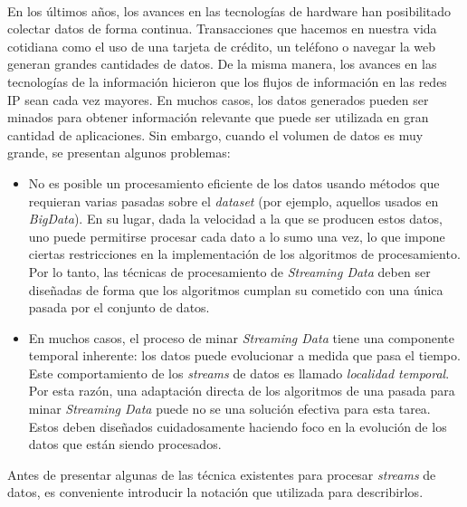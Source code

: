 \documentclass[a4paper,10pt, oneside]{article}
\begin{document}
\

En los últimos años, los avances en las tecnologías de hardware han posibilitado colectar datos de forma continua. Transacciones que hacemos en nuestra vida cotidiana como el uso de una tarjeta de crédito, un teléfono o navegar la web generan grandes cantidades de datos. De la misma manera, los avances en las tecnologías de la información hicieron que los flujos de información en las redes IP sean cada vez mayores. En muchos casos, los datos generados pueden ser minados para obtener información relevante que puede ser utilizada en gran cantidad de aplicaciones. Sin embargo, cuando el volumen de datos es muy grande, se presentan algunos problemas:

\begin{itemize}
	\item No es posible un procesamiento eficiente de los datos usando métodos que requieran varias pasadas sobre el \textit{dataset} (por ejemplo, aquellos usados en \textit{BigData}). En su lugar, dada la velocidad a la que se producen estos datos, uno puede permitirse procesar cada dato a lo sumo una vez, lo que impone ciertas restricciones en la implementación de los algoritmos de procesamiento. Por lo tanto, las técnicas de procesamiento de \textit{Streaming Data} deben ser diseñadas de forma que los algoritmos cumplan su cometido con una única pasada por el conjunto de datos.
	\item En muchos casos, el proceso de minar \textit{Streaming Data} tiene una componente temporal inherente: los datos puede evolucionar a medida que pasa el tiempo. Este comportamiento de los \textit{streams} de datos es llamado \textit{localidad temporal}\cite{Aggarwal:2006:DSM:1196418}. Por esta razón, una adaptación directa de los algoritmos de una pasada para minar \textit{Streaming Data} puede no se una solución efectiva para esta tarea. Estos deben diseñados cuidadosamente haciendo foco en la evolución de los datos que están siendo procesados.
\end{itemize}

Antes de presentar algunas de las técnica existentes para procesar \textit{streams} de datos, es conveniente introducir la notación que utilizada para describirlos.
\end{document}
